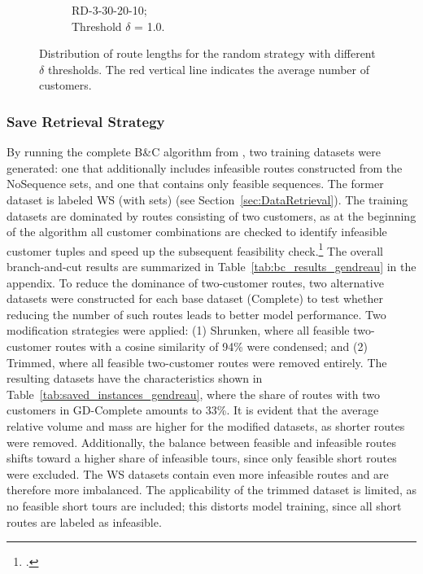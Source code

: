 \begin{figure}[!ht]
\begin{subfigure}[t]{.33\textwidth}
        \caption{RD-3-30-20-10; \\ Threshold $\delta$ = 1.0.}
        \label{fig:ds-c}
    \end{subfigure}
    \caption[Distribution of route lengths for the random strategy with different $\delta$ thresholds.]
    {Distribution of route lengths for the random strategy with different $\delta$ thresholds. The red vertical line indicates the average number of customers.}
    \label{fig:route-dists_randomdata}
\end{figure}

\FloatBarrier

\subsubsection{Save Retrieval Strategy}
By running the complete B\&C algorithm from \cite{tamke_branch-and-cut_2024}, two training datasets were generated: one that additionally
includes infeasible routes constructed from the NoSequence sets, and one that contains only feasible sequences. The former dataset is
labeled WS (with sets) (see Section~\ref{sec:DataRetrieval}).
The training datasets are dominated by routes consisting of two customers, as at the beginning of the algorithm all customer combinations
are checked to identify infeasible customer tuples and speed up the subsequent feasibility check.\footcite[cf.][]{tamke_branch-and-cut_2024} The overall branch-and-cut results are summarized
in Table~\ref{tab:bc_results_gendreau} in the appendix.
To reduce the dominance of two-customer routes, two alternative datasets were constructed for each base dataset (Complete) to test
whether reducing the number of such routes leads to better model performance. Two modification strategies were applied: (1) Shrunken,
where all feasible two-customer routes with a cosine similarity of 94\% were condensed; and (2) Trimmed, where all feasible two-customer
routes were removed entirely.
The resulting datasets have the characteristics shown in Table~\ref{tab:saved_instances_gendreau},
where the share of routes with two customers in GD-Complete amounts to 33\%. It is evident that the average
relative volume and mass are higher for the modified datasets, as shorter routes were removed. Additionally, the balance between feasible
and infeasible routes shifts toward a higher share of infeasible tours, since only feasible short routes were excluded. The WS datasets
contain even more infeasible routes and are therefore more imbalanced. The applicability of the trimmed dataset is limited, as no feasible
short tours are included; this distorts model training, since all short routes are labeled as infeasible.

